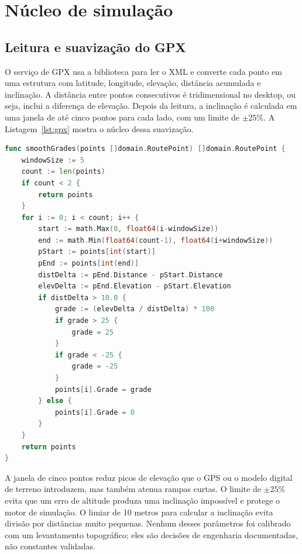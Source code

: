 \section{Núcleo de simulação}
\label{sec:implementacao-simulacao}

\subsection{Leitura e suavização do GPX}
\label{sec:implementacao-gpx}

O serviço de GPX usa a biblioteca  para ler o XML e converte cada
ponto em uma estrutura com latitude, longitude, elevação, distância acumulada e
inclinação. A distância entre pontos consecutivos é tridimensional no desktop,
ou seja, inclui a diferença de elevação. Depois da leitura, a inclinação é
calculada em uma janela de até cinco pontos para cada lado, com um limite de
$\pm 25\%$. A Listagem~\ref{lst:gpx} mostra o núcleo dessa suavização.

\begin{lstlisting}[language=Go, caption={Suavização de inclinação no serviço GPX do desktop}, label={lst:gpx}]
func smoothGrades(points []domain.RoutePoint) []domain.RoutePoint {
    windowSize := 5
    count := len(points)
    if count < 2 {
        return points
    }
    for i := 0; i < count; i++ {
        start := math.Max(0, float64(i-windowSize))
        end := math.Min(float64(count-1), float64(i+windowSize))
        pStart := points[int(start)]
        pEnd := points[int(end)]
        distDelta := pEnd.Distance - pStart.Distance
        elevDelta := pEnd.Elevation - pStart.Elevation
        if distDelta > 10.0 {
            grade := (elevDelta / distDelta) * 100
            if grade > 25 {
                grade = 25
            }
            if grade < -25 {
                grade = -25
            }
            points[i].Grade = grade
        } else {
            points[i].Grade = 0
        }
    }
    return points
}
\end{lstlisting}

A janela de cinco pontos reduz picos de elevação que o GPS ou o modelo digital
de terreno introduzem, mas também atenua rampas curtas. O limite de $\pm 25\%$
evita que um erro de altitude produza uma inclinação impossível e protege o
motor de simulação. O limiar de 10 metros para calcular a inclinação evita
divisão por distâncias muito pequenas. Nenhum desses parâmetros foi calibrado
com um levantamento topográfico; eles são decisões de engenharia documentadas,
não constantes validadas.

